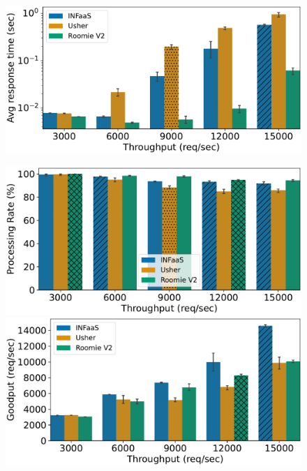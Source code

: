 \begin{figure}
	\begin{minipage}[t]{.24\linewidth}
		\centering
		\includegraphics[width=\linewidth]{chapters/roomie/images/NvidiaA100/synthetic-all-models/response_time.pdf}
		\label{fig:NvidiaA100/synthetic-all-models/response-time}
	\end{minipage}
	\hfill
	\begin{minipage}[t]{.24\linewidth}
		\centering
		\includegraphics[width=\linewidth]{chapters/roomie/images/NvidiaA100/synthetic-all-models/normalized.pdf}
	\end{minipage}
	\hfill
	\begin{minipage}[t]{.24\linewidth}
		\centering
		\includegraphics[width=\linewidth]{chapters/roomie/images/NvidiaA100/synthetic-all-models/goodput.pdf}

\end{minipage}
\end{figure}
